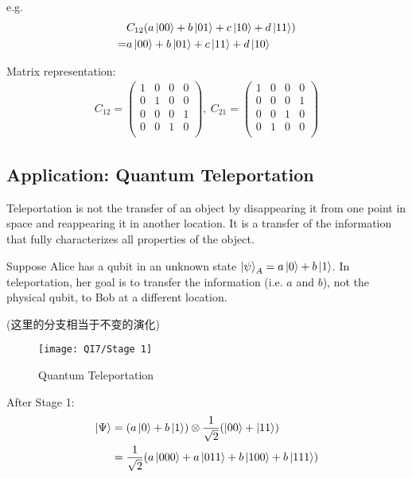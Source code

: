e.g. 
\begin{align*}
    &C_{12}(a\ket{00}+b\ket{01}+c\ket{10}+d\ket{11})\\
    =&a\ket{00}+b\ket{01}+c\ket{11}+d\ket{10}
\end{align*}

Matrix representation:
\begin{align*}
    C_{12}=\begin{pmatrix}
        1 & 0& 0&0\\
        0 & 1& 0&0\\
        0 & 0& 0&1\\
        0 & 0& 1&0\\
    \end{pmatrix},\ C_{21}=\begin{pmatrix}
        1 & 0& 0&0\\
        0 & 0& 0&1\\
        0 & 0& 1&0\\
        0 & 1& 0&0\\
    \end{pmatrix}
\end{align*}

\subsection{Application: Quantum Teleportation}
Teleportation is not the transfer of an object by disappearing it from one point in space and reappearing it in another location. It is a transfer of the information that fully characterizes all properties of the object.

Suppose Alice has a qubit in an unknown state $\ket{\psi}_A=a\ket{0}+b\ket{1}$. In teleportation, her goal is to transfer the information (i.e. $a$ and $b$), not the physical qubit, to Bob at a different location.

(这里的分支相当于不变的演化)

\begin{figure}[H]
    \centering
    \texttt{[image: QI7/Stage 1]}
    \caption{Quantum Teleportation}
\end{figure}

After Stage 1:
\begin{align*}
    \ket{\Psi}&=(a\ket{0}+b\ket{1})\otimes\frac{1}{\sqrt{2}}(\ket{00}+\ket{11})\\
    &=\frac{1}{\sqrt{2}}(a\ket{000}+a\ket{011}+b\ket{100}+b\ket{111})
\end{align*}

